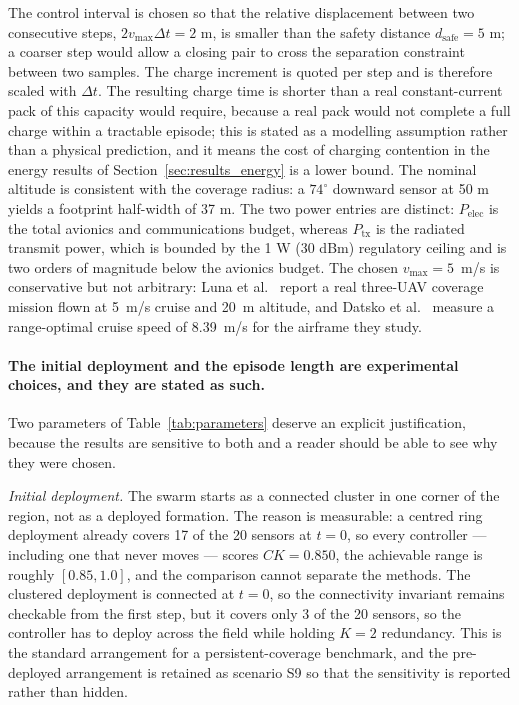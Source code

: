 \documentclass[conference]{IEEEtran}
\begin{document}
The control interval is chosen so that the relative displacement between two consecutive steps, $2 v_{\max}\Delta t = 2$ m, is smaller than the safety distance $d_{\mathrm{safe}} = 5$ m; a coarser step would allow a closing pair to cross the separation constraint between two samples. The charge increment is quoted per step and is therefore scaled with $\Delta t$. The resulting charge time is shorter than a real constant-current pack of this capacity would require, because a real pack would not complete a full charge within a tractable episode; this is stated as a modelling assumption rather than a physical prediction, and it means the cost of charging contention in the energy results of Section~\ref{sec:results_energy} is a lower bound. The nominal altitude is consistent with the coverage radius: a $74^\circ$ downward sensor at 50 m yields a footprint half-width of 37 m. The two power entries are distinct: $P_{\mathrm{elec}}$ is the total avionics and communications budget, whereas $P_{\mathrm{tx}}$ is the radiated transmit power, which is bounded by the 1 W (30 dBm) regulatory ceiling and is two orders of magnitude below the avionics budget. The chosen $v_{\max}=5$~m/s is conservative but not arbitrary: Luna et al.~\cite{luna2022} report a real three-UAV coverage mission flown at 5~m/s cruise and 20~m altitude, and Datsko et al.~\cite{datsko2024} measure a range-optimal cruise speed of 8.39~m/s for the airframe they study.

\paragraph{The initial deployment and the episode length are experimental choices,
and they are stated as such.}
Two parameters of Table~\ref{tab:parameters} deserve an explicit justification, because the results are sensitive to both and a reader should be able to see why they were chosen.

\emph{Initial deployment.} The swarm starts as a connected cluster in one corner of the region, not as a deployed formation. The reason is measurable: a centred ring deployment already covers 17 of the 20 sensors at $t=0$, so every controller --- including one that never moves --- scores $CK=0.850$, the achievable range is roughly $[0.85,1.0]$, and the comparison cannot separate the methods. The clustered deployment is connected at $t=0$, so the connectivity invariant remains checkable from the first step, but it covers only 3 of the 20 sensors, so the controller has to deploy across the field while holding $K=2$ redundancy. This is the standard arrangement for a persistent-coverage benchmark, and the pre-deployed arrangement is retained as scenario S9 so that the sensitivity is reported rather than hidden.
\end{document}
